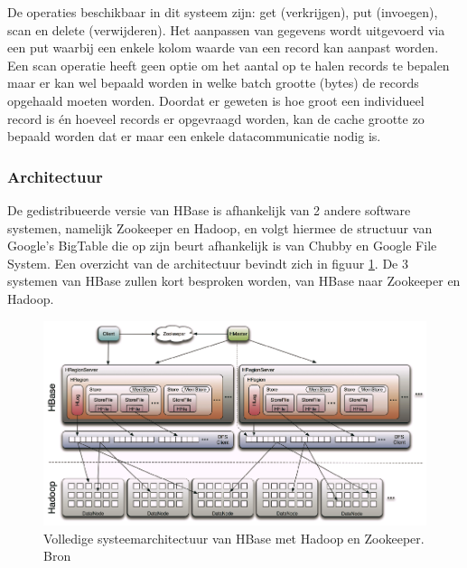 De operaties beschikbaar in dit systeem zijn: get (verkrijgen), put (invoegen), scan en delete (verwijderen). Het aanpassen van gegevens wordt uitgevoerd via een put waarbij een enkele kolom waarde van een record kan aanpast worden. Een scan operatie heeft geen optie om het aantal op te halen records te bepalen maar er kan wel bepaald worden in welke batch grootte (bytes) de records opgehaald moeten worden. Doordat er geweten is hoe groot een individueel record is én hoeveel records er opgevraagd worden, kan de cache grootte zo bepaald worden dat er maar een enkele datacommunicatie nodig is. 

\subsubsection{Architectuur\cite{george2011hbase}}
De gedistribueerde versie van HBase is afhankelijk van 2 andere software systemen, namelijk Zookeeper\cite{hunt2010zookeeper} en Hadoop\cite{borthakur2007hadoop}, en volgt hiermee de structuur van Google's BigTable\cite{chang2008bigtable} die op zijn beurt afhankelijk is van Chubby\cite{burrows2006chubby} en Google File System\cite{ghemawat2003google}. Een overzicht van de architectuur bevindt zich in figuur \ref{fig:Hbase-structure}. De 3 systemen van HBase zullen kort besproken worden, van HBase naar Zookeeper en Hadoop. 

\begin{figure}[h!]
\centering
\includegraphics[width=\linewidth]{img/Hbase-structure.png}
\caption{Volledige systeemarchitectuur van HBase met Hadoop en Zookeeper. Bron \cite{ChinHBaseComprehensive}}
\label{fig:Hbase-structure}
\end{figure}

